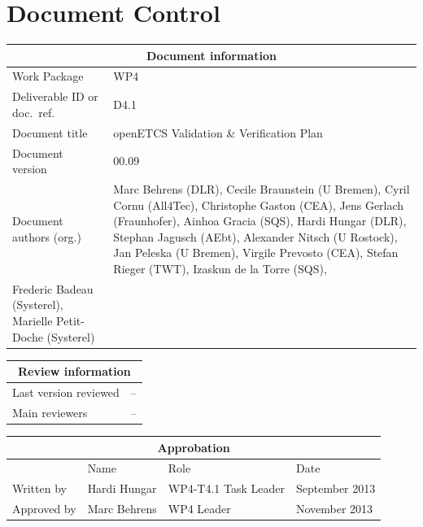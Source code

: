 \documentclass{template/openetcs_report}
\begin{document}
\maketitle
\tableofcontents
\listoffiguresandtables
\newpage

\chapter{Document Control}

\begin{tabular}{|p{4.4cm}|p{8.7cm}|}
  \hline
  \multicolumn{2}{|c|}{Document information} \\
  \hline
  Work Package &  WP4  \\
  Deliverable ID or doc.\ ref.\ & D4.1\\
  \hline
  Document title & openETCS Validation \& Verification Plan\\
  Document version & 00.09 \\
  Document authors (org.)  &  Marc Behrens (DLR),
  Cecile Braunstein (U Bremen), Cyril Cornu (All4Tec), Christophe
  Gaston (CEA), Jens Gerlach 
  (Fraunhofer), Ainhoa Gracia (SQS), Hardi Hungar (DLR), Stephan Jagusch
  (AEbt), Alexander Nitsch (U Rostock), Jan Peleska (U Bremen),
  Virgile Prevosto (CEA),
  Stefan Rieger (TWT), Izaskun de la Torre (SQS),\\
  Frederic Badeau (Systerel), Marielle Petit-Doche (Systerel)\\
  \hline
\end{tabular}

\begin{tabular}{|p{4.4cm}|p{8.7cm}|}
\hline
\multicolumn{2}{|c|}{Review information} \\
\hline
Last version reviewed & -- \\
\hline
Main reviewers & -- \\
\hline
\end{tabular}

\begin{tabular}{|p{2.2cm}|p{4cm}|p{4cm}|p{2cm}|}
\hline
\multicolumn{4}{|c|}{Approbation} \\
\hline
  &  Name & Role & Date   \\
\hline  
Written by    &  Hardi Hungar & WP4-T4.1 Task Leader  & September 2013\\
\hline
Approved by & Marc Behrens & WP4 Leader & November 2013 \\
\hline
\end{tabular}
\end{document}
